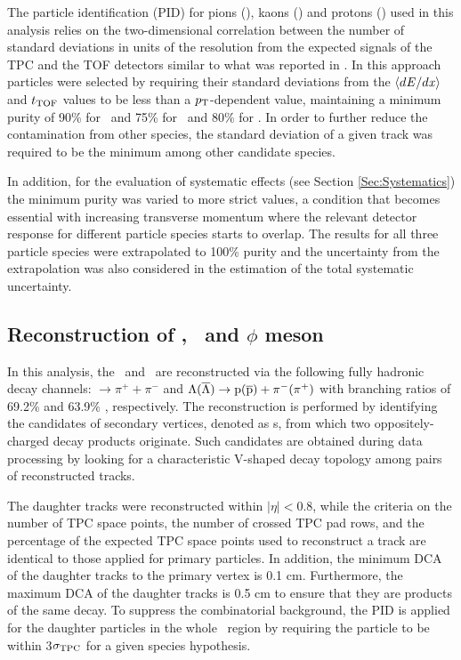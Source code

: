 The particle identification (PID) for pions (\pion), kaons (\kaon) and protons (\proton) used in this analysis relies on the two-dimensional correlation between the number of standard deviations in units of the resolution from the expected signals of the TPC and the TOF detectors similar to what was reported in \cite{Abelev:2014pua,Adam:2016nfo,Acharya:2018zuq}. In this approach particles were selected by requiring their standard deviations from the $\langle d{\it E}/d{\it x}\rangle$ and $t_{\rm TOF}$ values to be less than a $p_{\rm T}$-dependent value, maintaining a minimum purity of 90\% for \pion~and 75\% for \kaon~and 80\% for \proton. In order to further reduce the contamination from other species, the standard deviation of a given track was required to be the minimum among other candidate species. 

In addition, for the evaluation of systematic effects (see Section \ref{Sec:Systematics}) the minimum purity was varied to more strict values, a condition that becomes essential with increasing transverse momentum where the relevant detector response for different particle species starts to overlap. The results for all three particle species were extrapolated to 100\% purity and the uncertainty from the extrapolation was also considered in the estimation of the total systematic uncertainty.

\subsection{Reconstruction of \Ks, \lambdas~and $\phi$ meson}
\label{SubSec:K0sLambdaPhiRec}

In this analysis, the \Ks~and \lambdas~are reconstructed via the following fully hadronic decay channels: \Ks $\rightarrow \pi^{+} + \pi^{-}$ and  $\Lambda(\overline{\Lambda})\rightarrow {\rm p}(\overline{\rm p})+\pi^{-}(\pi^{+})$ with branching ratios of 69.2\% and 63.9\% \cite{PhysRevD.98.030001}, respectively. The reconstruction is performed by identifying the candidates of secondary vertices, denoted as \vo s, from which two oppositely-charged decay products originate. Such candidates are obtained during data processing by looking for a characteristic V-shaped decay topology among pairs of reconstructed tracks.

The daughter tracks were reconstructed within $|\eta|<0.8$, while the criteria on the number of TPC space points, the number of crossed TPC pad rows, and the percentage of the expected TPC space points used to reconstruct a track are identical to those applied for primary particles. In addition, the minimum DCA of the daughter tracks to the primary vertex is 0.1 cm. Furthermore, the maximum DCA of the daughter tracks is 0.5 cm to ensure that they are products of the same decay. To suppress the combinatorial background, the PID is applied for the daughter particles in the whole \pT~region by requiring the particle to be within 3$\sigma_{\rm TPC}$ for a given species hypothesis.

